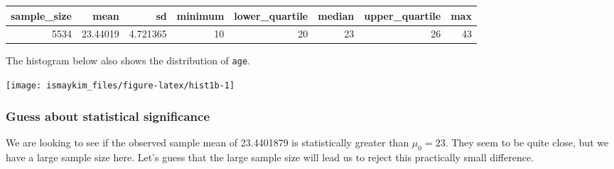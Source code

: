 \documentclass[]{tufte-book}
\newenvironment{Shaded}{\begin{snugshade}}{\end{snugshade}}
\newcommand{\KeywordTok}[1]{\textcolor[rgb]{0.13,0.29,0.53}{\textbf{{#1}}}}
\newcommand{\DataTypeTok}[1]{\textcolor[rgb]{0.13,0.29,0.53}{{#1}}}
\newcommand{\DecValTok}[1]{\textcolor[rgb]{0.00,0.00,0.81}{{#1}}}
\newcommand{\FloatTok}[1]{\textcolor[rgb]{0.00,0.00,0.81}{{#1}}}
\newcommand{\StringTok}[1]{\textcolor[rgb]{0.31,0.60,0.02}{{#1}}}
\newcommand{\NormalTok}[1]{{#1}}
\begin{document}
\begin{Shaded}
\end{Shaded}

\begin{tabular}{r|r|r|r|r|r|r|r}
\hline
sample\_size & mean & sd & minimum & lower\_quartile & median & upper\_quartile & max\\
\hline
5534 & 23.44019 & 4.721365 & 10 & 20 & 23 & 26 & 43\\
\hline
\end{tabular}

The histogram below also shows the distribution of \texttt{age}.

\begin{Shaded}
\end{Shaded}

\begin{center}\texttt{[image: ismaykim\_files/figure-latex/hist1b-1]} \end{center}

\subsubsection{Guess about statistical
significance}\label{guess-about-statistical-significance}

We are looking to see if the observed sample mean of 23.4401879 is
statistically greater than \(\mu_0 = 23\). They seem to be quite close,
but we have a large sample size here. Let's guess that the large sample
size will lead us to reject this practically small difference.
\end{document}
